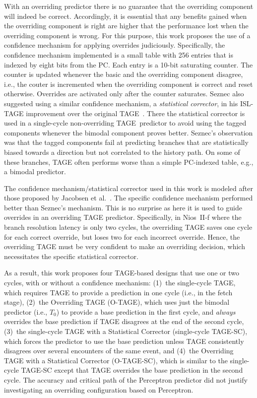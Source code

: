 With an overriding predictor there is no guarantee that the overriding component will indeed be correct. Accordingly, it is essential that any benefits gained when the overriding component is right are higher that the performance lost when the overriding component is wrong. For this purpose, this work proposes the use of a confidence mechanism for applying overrides judiciously. Specifically, the confidence mechanism implemented is a small table with 256 entries that is indexed by eight bits from the PC. Each entry is a 10-bit saturating counter.  The counter is updated whenever the basic and the overriding component disagree, i.e., the couter is incremented when the overriding component is correct and reset otherwise. Overrides are activated only after the counter saturates. Seznec also suggested using a similar confidence mechanism, a \textit{statistical corrector}, in his ISL-TAGE improvement over the original TAGE~\cite{isltage}.  There the statistical corrector is used in a single-cycle non-overriding TAGE\ predictor to avoid using the tagged components whenever the bimodal component proves better.  Seznec's observation was that the tagged components fail at predicting branches that are statistically biased towards a direction but not correlated to the history path. On some of these branches, TAGE often performs worse than a simple PC-indexed table, e.g., a bimodal predictor.

The confidence mechanism/statistical corrector used in this work is modeled after those proposed by Jacobsen et al.~\cite{confidence}. The specific confidence mechanism performed better than Seznec's mechanism. This is no surprise as here it is used to guide overrides in an overriding TAGE predictor.
Specifically, in Nios~II-f where the branch resolution latency is only two cycles, the overriding TAGE saves one cycle for each correct override, but loses two for each incorrect override. 
Hence, the overriding TAGE must be very confident to make an overriding decision, which necessitates the specific statistical corrector.

As a result, this work proposes four TAGE-based designs that use one or two cycles, with or without a confidence mechanism:  (1)~the single-cycle TAGE, which requires TAGE to provide a prediction in one cycle (i.e., in the fetch stage), (2)~the Overriding TAGE (\mbox{O-TAGE}), which uses just the bimodal predictor (i.e., $T_0$) to provide a base prediction in the first cycle, and \textit{always} overrides the base prediction if TAGE disagrees at the end of the second cycle, (3)~the single-cycle TAGE with a Statistical Corrector (single-cycle \mbox{TAGE-SC}), which forces the predictor to use the base prediction unless TAGE consistently disagrees over several encounters of the same event, and (4)~the Overriding TAGE with a Statistical Corrector (\mbox{O-TAGE-SC}), which is similar to the single-cycle \mbox{TAGE-SC} except that TAGE overrides the base prediction in the second cycle. The accuracy and critical path of the Perceptron predictor did not justify investigating an overriding configuration based on Perceptron.

